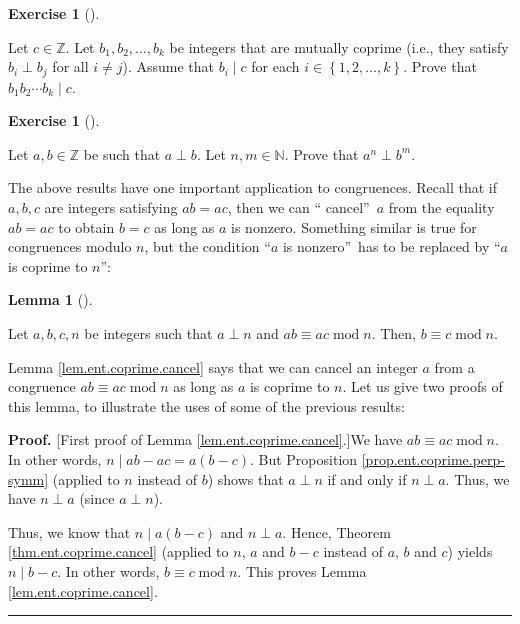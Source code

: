 \documentclass[numbers=enddot,12pt,final,onecolumn,notitlepage]{scrartcl}%
\newcounter{exer}
\numberwithin{exer}{subsection}
\theoremstyle{definition}
\newtheorem{lem}[theo]{Lemma}
\newenvironment{lemma}[1][]
{\begin{lem}[#1]\begin{leftbar}}
{\end{leftbar}\end{lem}}
\newtheorem{exmp}[exer]{Exercise}
\newenvironment{exercise}[1][]
{\begin{exmp}[#1]\begin{leftbar}}
{\end{leftbar}\end{exmp}}
\newenvironment{proof}[1][Proof]{\noindent\textbf{#1.} }{\ \rule{0.5em}{0.5em}}
\begin{document}
\begin{exercise}
\label{exe.ent.coprime.combinek}Let $c\in\mathbb{Z}$. Let $b_{1},b_{2}%
,\ldots,b_{k}$ be integers that are mutually coprime (i.e., they satisfy
$b_{i}\perp b_{j}$ for all $i\neq j$). Assume that $b_{i}\mid c$ for each
$i\in\left\{  1,2,\ldots,k\right\}  $. Prove that $b_{1}b_{2}\cdots b_{k}\mid
c$.
\end{exercise}

\begin{exercise}
\label{exe.ent.coprime.powers}Let $a,b\in\mathbb{Z}$ be such that $a\perp b$.
Let $n,m\in\mathbb{N}$. Prove that $a^{n}\perp b^{m}$.
\end{exercise}

The above results have one important application to congruences. Recall that
if $a,b,c$ are integers satisfying $ab=ac$, then we can \textquotedblleft
cancel\textquotedblright\ $a$ from the equality $ab=ac$ to obtain $b=c$ as
long as $a$ is nonzero. Something similar is true for congruences modulo $n$,
but the condition \textquotedblleft$a$ is nonzero\textquotedblright\ has to be
replaced by \textquotedblleft$a$ is coprime to $n$\textquotedblright:

\begin{lemma}
\label{lem.ent.coprime.cancel}Let $a,b,c,n$ be integers such that $a\perp n$
and $ab\equiv ac\operatorname{mod}n$. Then, $b\equiv c\operatorname{mod}n$.
\end{lemma}

Lemma \ref{lem.ent.coprime.cancel} says that we can cancel an integer $a$ from
a congruence $ab\equiv ac\operatorname{mod}n$ as long as $a$ is coprime to
$n$. Let us give two proofs of this lemma, to illustrate the uses of some of
the previous results:

\begin{proof}
[First proof of Lemma \ref{lem.ent.coprime.cancel}.]We have $ab\equiv
ac\operatorname{mod}n$. In other words, $n\mid ab-ac=a\left(  b-c\right)  $.
But Proposition \ref{prop.ent.coprime.perp-symm} (applied to $n$ instead of
$b$) shows that $a\perp n$ if and only if $n\perp a$. Thus, we have $n\perp a$
(since $a\perp n$).

Thus, we know that $n\mid a\left(  b-c\right)  $ and $n\perp a$. Hence,
Theorem \ref{thm.ent.coprime.cancel} (applied to $n$, $a$ and $b-c$ instead of
$a$, $b$ and $c$) yields $n\mid b-c$. In other words, $b\equiv
c\operatorname{mod}n$. This proves Lemma \ref{lem.ent.coprime.cancel}.
\end{proof}
\end{document}
